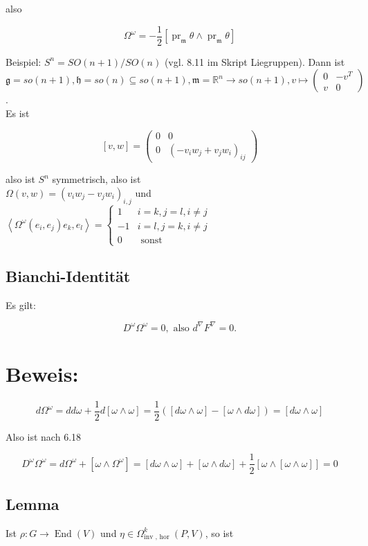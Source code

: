 \documentclass[10pt, letterpaper]{article}
\begin{document}
also

$$
\Omega^{\omega}=-\frac{1}{2}\left[\operatorname{pr}_{\mathfrak{m}} \theta \wedge \operatorname{pr}_{\mathfrak{m}} \theta\right]
$$

Beispiel: $S^{n}=S O(n+1) / S O(n)$ (vgl. 8.11 im Skript Liegruppen). Dann ist\\
$\mathfrak{g}=s o(n+1), \mathfrak{h}=s o(n) \subseteq s o(n+1), \mathfrak{m}=\mathbb{R}^{n} \rightarrow s o(n+1), v \mapsto\left(\begin{array}{cc}0 & -v^{T} \\ v & 0\end{array}\right)$.\\
Es ist

$$
[v, w]=\left(\begin{array}{cc}
0 & 0 \\
0 & \left(-v_{i} w_{j}+v_{j} w_{i}\right)_{i j}
\end{array}\right)
$$

also ist $S^{n}$ symmetrisch, also ist\\
$\Omega(v, w)=\left(v_{i} w_{j}-v_{j} w_{i}\right)_{i, j}$ und $\left\langle\Omega^{\omega}\left(e_{i}, e_{j}\right) e_{k}, e_{l}\right\rangle= \begin{cases}1 & i=k, j=l, i \neq j \\ -1 & i=l, j=k, i \neq j \\ 0 & \text { sonst }\end{cases}$

\subsection*{Bianchi-Identität}
Es gilt:

$$
D^{\omega} \Omega^{\omega}=0, \text { also } d^{\nabla} F^{\nabla}=0 .
$$

\section*{Beweis:}
$$
d \Omega^{\omega}=d d \omega+\frac{1}{2} d[\omega \wedge \omega]=\frac{1}{2}([d \omega \wedge \omega]-[\omega \wedge d \omega])=[d \omega \wedge \omega]
$$

Also ist nach 6.18

$$
D^{\omega} \Omega^{\omega}=d \Omega^{\omega}+\left[\omega \wedge \Omega^{\omega}\right]=[d \omega \wedge \omega]+[\omega \wedge d \omega]+\frac{1}{2}[\omega \wedge[\omega \wedge \omega]]=0
$$

\subsection*{Lemma}
Ist $\rho: G \rightarrow \operatorname{End}(V)$ und $\eta \in \Omega_{\text {inv }, \text { hor }}^{k}(P, V)$, so ist
\end{document}
